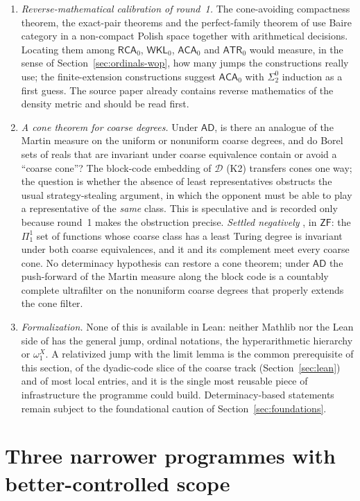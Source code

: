 \documentclass[11pt,a4paper]{article}
\newcommand{\D}{\mathcal D}
\theoremstyle{definition}\newtheorem{definition}[theorem]{Definition}
\theoremstyle{remark}\newtheorem{remark}[theorem]{Remark}
\begin{document}
\begin{enumerate}[label=\textup{(O\arabic*)},leftmargin=3em]
\item \emph{Reverse-mathematical calibration of round~1.} The cone-avoiding compactness theorem, the exact-pair theorems and the perfect-family theorem of \cite{Synthesis} use Baire category in a non-compact Polish space together with arithmetical decisions. Locating them among $\mathsf{RCA}_0$, $\mathsf{WKL}_0$, $\mathsf{ACA}_0$ and $\mathsf{ATR}_0$ would measure, in the sense of Section~\ref{sec:ordinals-wop}, how many jumps the constructions really use; the finite-extension constructions suggest $\mathsf{ACA}_0$ with $\Sigma^0_2$ induction as a first guess. The source paper \cite{HJS} already contains reverse mathematics of the density metric and should be read first.
\item \emph{A cone theorem for coarse degrees.} Under $\mathsf{AD}$, is there an analogue of the Martin measure on the uniform or nonuniform coarse degrees, and do Borel sets of reals that are invariant under coarse equivalence contain or avoid a ``coarse cone''? The block-code embedding of $\D$ (K2) transfers cones one way; the question is whether the absence of least representatives obstructs the usual strategy-stealing argument, in which the opponent must be able to play a representative of the \emph{same} class. This is speculative and is recorded only because round~1 makes the obstruction precise. \emph{Settled negatively} \cite[Theorem 1.5]{ReportTen}, in $\mathsf{ZF}$: the $\Pi^1_1$ set of functions whose coarse class has a least Turing degree is invariant under both coarse equivalences, and it and its complement meet every coarse cone. No determinacy hypothesis can restore a cone theorem; under $\mathsf{AD}$ the push-forward of the Martin measure along the block code is a countably complete ultrafilter on the nonuniform coarse degrees that properly extends the cone filter.
\item \emph{Formalization.} None of this is available in Lean: neither Mathlib nor the Lean side of  has the general jump, ordinal notations, the hyperarithmetic hierarchy or $\omega_1^X$. A relativized jump with the limit lemma is the common prerequisite of this section, of the dyadic-code slice of the coarse track (Section~\ref{sec:lean}) and of most local entries, and it is the single most reusable piece of infrastructure the programme could build. Determinacy-based statements remain subject to the foundational caution of Section~\ref{sec:foundations}.
\end{enumerate}

\section{Three narrower programmes with better-controlled scope}
\label{sec:projects}
\end{document}
